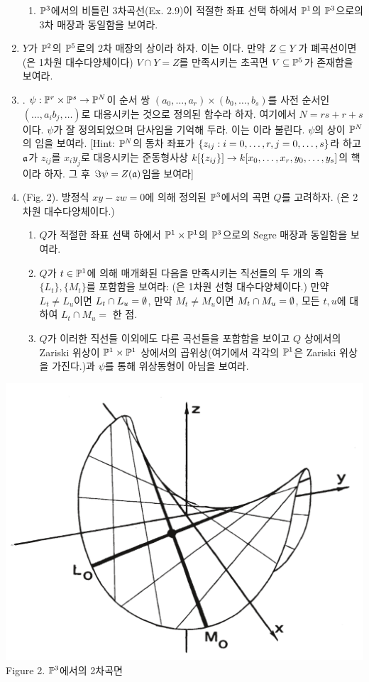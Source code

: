 \begin{enumerate}[label=\tb{2.\arabic*.},itemindent=0mm,itemsep=2mm]
\begin{enumerate}[label=(\alph*)]
	\item $\mathbb{P}^3$에서의 비틀린 3차곡선(Ex. 2.9)이 적절한 좌표 선택 하에서
	$\mathbb{P}^1$의 $\mathbb{P}^3$으로의 3차 매장과 동일함을 보여라.
	\end{enumerate}
	\item $Y$가 $\mathbb{P}^2$의 $\mathbb{P}^5$로의 2차 매장의 상이라 하자. 이는 이다.
	만약 $Z\subseteq Y$가 폐곡선이면(은 1차원 대수다양체이다)
	$V\cap Y=Z$를 만족시키는 초곡면 $V\subseteq\mathbb{P}^5$가 존재함을 보여라.
	\item {}. $\psi:\mathbb{P}^r\times\mathbb{P}^s\rightarrow\mathbb{P}^N$이 순서 쌍 $(a_0,\ldots,a_r)\times(b_0,\ldots,b_s)$를
	사전 순서인 $(\ldots,a_ib_j,\ldots)$로 대응시키는 것으로 정의된 함수라 하자. 여기에서 $N=rs+r+s$이다.
	$\psi$가 잘 정의되었으며 단사임을 기억해 두라. 이는 이라 불린다.
	$\psi$의 상이 $\mathbb{P}^N$의 임을 보여라.
	[Hint: $\mathbb{P}^N$의 동차 좌표가 $\{z_{ij}:i=0,\ldots,r,j=0,\ldots,s\}$라 하고
	$\mathfrak{a}$가 $z_{ij}$를 $x_iy_j$로 대응시키는 준동형사상 $k[\{z_{ij}\}]\rightarrow k[x_0,\ldots,x_r,y_0,\ldots,y_s]$의 핵이라 하자.
	그 후 $\Im\psi=Z(\mathfrak{a})$임을 보여라]
	\item {} (Fig. 2). 방정식 $xy-zw=0$에 의해 정의된 $\mathbb{P}^3$에서의 곡면 $Q$를 고려하자.
	(은 2차원 대수다양체이다.)
	\begin{enumerate}[label=(\alph*)]
	\item $Q$가 적절한 좌표 선택 하에서 $\mathbb{P}^1\times\mathbb{P}^1$의 $\mathbb{P}^3$으로의 Segre 매장과 동일함을 보여라.
	\item $Q$가 $t\in\mathbb{P}^1$에 의해 매개화된 다음을 만족시키는 직선들의 두 개의 족 $\{L_t\},\{M_t\}$를 포함함을 보여라:
	(은 1차원 선형 대수다양체이다.)
	만약 $L_t\ne L_u$이면 $L_t\cap L_u=\emptyset$, 만약 $M_t\ne M_u$이면 $M_t\cap M_u=\emptyset$,
	모든 $t,u$에 대하여 $L_t\cap M_u=$ 한 점.
	\item $Q$가 이러한 직선들 이외에도 다른 곡선들을 포함함을 보이고 $Q$ 상에서의 Zariski 위상이
	$\mathbb{P}^1\times\mathbb{P}^1$ 상에서의 곱위상(여기에서 각각의 $\mathbb{P}^1$은 Zariski 위상을 가진다.)과
	$\psi$를 통해 위상동형이 아님을 보여라.
	\end{enumerate}
	\end{enumerate}
	\begin{center}
	\includegraphics[width=0.5\columnwidth]{Figure2}\\
	Figure 2. $\mathbb{P}^3$에서의 2차곡면
	\end{center}
